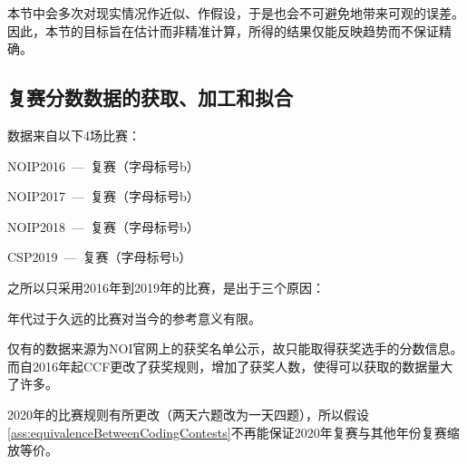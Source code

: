     本节中会多次对现实情况作近似、作假设，于是也会不可避免地带来可观的误差。因此，本节的目标旨在估计而非精准计算，所得的结果仅能反映趋势而不保证精确。

    \subsection{复赛分数数据的获取、加工和拟合}\label{sec:dataPreprocessingOfNOIP}

        数据来自以下4场比赛：
        \begin{asparaitem}
            \item NOIP2016\ ---\ 复赛（字母标号b）
            \item NOIP2017\ ---\ 复赛（字母标号b）
            \item NOIP2018\ ---\ 复赛（字母标号b）
            \item CSP2019\ ---\ 复赛（字母标号b）
        \end{asparaitem}

        \vspace{1.5ex}

        之所以只采用2016年到2019年的比赛，是出于三个原因：
        \begin{asparaitem}
            \item 年代过于久远的比赛对当今的参考意义有限。
            \item 仅有的数据来源为NOI官网上的获奖名单公示，故只能取得获奖选手的分数信息。而自2016年起CCF更改了获奖规则，增加了获奖人数，使得可以获取的数据量大了许多。
            \item 2020年的比赛规则有所更改（两天六题改为一天四题），所以假设\ref{ass:equivalenceBetweenCodingContests}不再能保证2020年复赛与其他年份复赛缩放等价。
        \end{asparaitem}

        \vspace{1.5ex}

        \begin{table}[htbp]
            \centering
            \caption{4场比赛的相关数据}
            \label{tab:noip16to19}
        \end{table}

